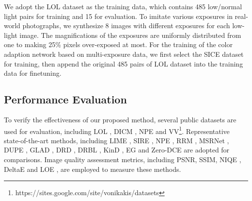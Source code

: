\documentclass[10pt,twocolumn,letterpaper]{article}
\begin{document}
We adopt the LOL dataset as the training data, which contains 485 low/normal light pairs for training and 15 for evaluation. To imitate various exposures in real-world photographs, we synthesize 8 images with different exposures for each low-light image. The magnifications of the exposures are uniformly distributed from one to making 25\% pixels over-exposed at most. For the training of the color adaption network based on multi-exposure data, we first select the SICE dataset \cite{cai2018learning} for training, then append the original 485 pairs of LOL dataset into the training data for finetuning. 

\subsection{Performance Evaluation}
To verify the effectiveness of our proposed method, several public datasets are used for evaluation, including LOL \cite{DBLP:conf/bmvc/WeiWY018}, DICM \cite{lee2013contrast}, NPE \cite{wang2013naturalness} and VV\footnote{https://sites.google.com/site/vonikakis/datasets}. Representative state-of-the-art methods, including LIME \cite{guo2016lime}, SIRE \cite{fu2016weighted}, NPE \cite{wang2013naturalness}, RRM \cite{li2018structure}, MSRNet \cite{shen2017msr}, DUPE \cite{wang2019underexposed}, GLAD \cite{wang2018gladnet}, DRD \cite{DBLP:conf/bmvc/WeiWY018}, DRBL \cite{yang2020fidelity}, KinD \cite{zhang2019kindling}, EG \cite{jiang2021enlightengan} and Zero-DCE \cite{guo2020zero} are adopted for comparisons. Image quality assessment metrics, including PSNR, SSIM, NIQE \cite{Mittal2013MakingA}, DeltaE \cite{Sharma2005TheCC} and LOE \cite{Wang2013NaturalnessPE}, are employed to measure these methods.  
\end{document}
